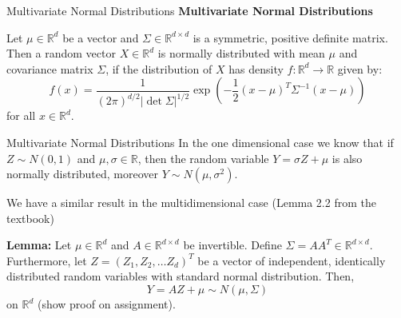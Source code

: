 \documentclass[8pt]{beamer}
\begin{document}
\begin{frame}{Multivariate Normal Distributions}
\textbf{Multivariate Normal Distributions}

\vspace{3mm}

Let $\mu \in \mathbb{R}^d$ be a vector and $\Sigma \in \mathbb{R}^{d \times d}$ is a symmetric, positive definite matrix. Then a random vector $X\in \mathbb{R}^d$ is normally distributed with mean $\mu$ and covariance matrix $\Sigma$, if the distribution of $X$ has density $f: \mathbb{R}^d \rightarrow \mathbb{R}$ given by:
\begin{equation*}
f(x)=\frac{1}{(2\pi)^{d/2} |\det \Sigma| ^{1/2}}
\exp\left(-\frac{1}{2}(x-\mu)^T\Sigma^{-1}(x-\mu) \right)
\end{equation*}
for all $x \in \mathbb{R}^d$.
\end{frame}

\begin{frame}{Multivariate Normal Distributions}
In the one dimensional case we know that if $Z \sim N(0,1)$ and $\mu, \sigma \in \mathbb{R}$, then the random variable $Y=\sigma Z+\mu$ is also normally distributed, moreover $Y \sim N(\mu, \sigma^2)$. 
\vspace{2mm}

We have a similar result in the multidimensional case (Lemma 2.2 from the textbook)
\vspace{2mm}

{\bf Lemma:} Let $\mu \in \mathbb{R}^d$ and $A  \in \mathbb{R}^{d \times d}$   be invertible. Define $\Sigma=A A^T \in \mathbb{R}^{d \times d}$. Furthermore, let $Z=(Z_1,Z_2, \ldots Z_d)^T$ be a vector of independent, identically distributed random variables with standard normal distribution. Then,$$Y=AZ+\mu \sim N(\mu, \Sigma)$$
on $\mathbb{R}^d$ (show proof on assignment).
\end{frame}
\end{document}
